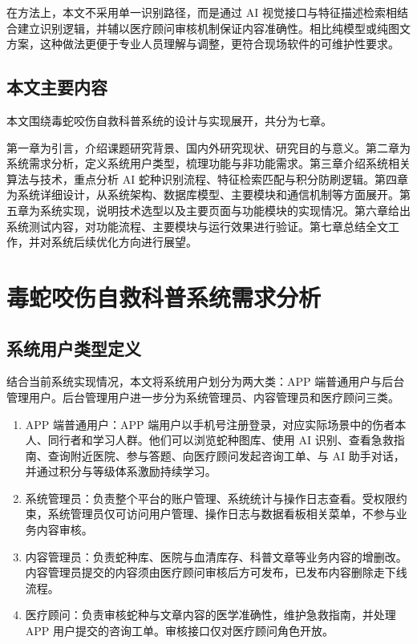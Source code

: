 \documentclass[12pt, a4paper, oneside]{ctexrep}
\begin{document}
在方法上，本文不采用单一识别路径，而是通过 AI 视觉接口与特征描述检索相结合建立识别逻辑，并辅以医疗顾问审核机制保证内容准确性。相比纯模型或纯图文方案，这种做法更便于专业人员理解与调整，更符合现场软件的可维护性要求。

\section{本文主要内容}
本文围绕毒蛇咬伤自救科普系统的设计与实现展开，共分为七章。

第一章为引言，介绍课题研究背景、国内外研究现状、研究目的与意义。第二章为系统需求分析，定义系统用户类型，梳理功能与非功能需求。第三章介绍系统相关算法与技术，重点分析 AI 蛇种识别流程、特征检索匹配与积分防刷逻辑。第四章为系统详细设计，从系统架构、数据库模型、主要模块和通信机制等方面展开。第五章为系统实现，说明技术选型以及主要页面与功能模块的实现情况。第六章给出系统测试内容，对功能流程、主要模块与运行效果进行验证。第七章总结全文工作，并对系统后续优化方向进行展望。

\chapter{毒蛇咬伤自救科普系统需求分析}

\section{系统用户类型定义}
结合当前系统实现情况，本文将系统用户划分为两大类：APP 端普通用户与后台管理用户。后台管理用户进一步分为系统管理员、内容管理员和医疗顾问三类。

\begin{enumerate}
  \item APP 端普通用户：APP 端用户以手机号注册登录，对应实际场景中的伤者本人、同行者和学习人群。他们可以浏览蛇种图库、使用 AI 识别、查看急救指南、查询附近医院、参与答题、向医疗顾问发起咨询工单、与 AI 助手对话，并通过积分与等级体系激励持续学习。
  \item 系统管理员：负责整个平台的账户管理、系统统计与操作日志查看。受权限约束，系统管理员仅可访问用户管理、操作日志与数据看板相关菜单，不参与业务内容审核。
  \item 内容管理员：负责蛇种库、医院与血清库存、科普文章等业务内容的增删改。内容管理员提交的内容须由医疗顾问审核后方可发布，已发布内容删除走下线流程。
  \item 医疗顾问：负责审核蛇种与文章内容的医学准确性，维护急救指南，并处理 APP 用户提交的咨询工单。审核接口仅对医疗顾问角色开放。
\end{enumerate}
\end{document}
